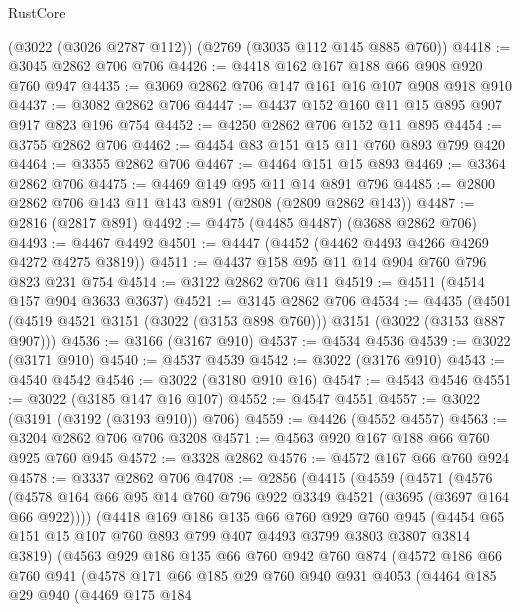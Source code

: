 \begin{lexlean}{RustCore}
\begin{coremodule}
    (@3022 (@3026 @2787 @112))
    (@2769 (@3035 @112 @145 @885 @760))
@4418 := @3045 @2862 @706 @706
@4426 := @4418 @162 @167 @188 @66 @908 @920 @760 @947
@4435 := @3069 @2862 @706 @147 @161 @16 @107 @908 @918 @910
@4437 := @3082 @2862 @706
@4447 := @4437 @152 @160 @11 @15 @895 @907 @917 @823 @196 @754
@4452 := @4250 @2862 @706 @152 @11 @895
@4454 := @3755 @2862 @706
@4462 := @4454 @83 @151 @15 @11 @760 @893 @799 @420
@4464 := @3355 @2862 @706
@4467 := @4464 @151 @15 @893
@4469 := @3364 @2862 @706
@4475 := @4469 @149 @95 @11 @14 @891 @796
@4485 := @2800 @2862 @706 @143 @11 @143 @891 (@2808 (@2809 @2862 @143))
@4487 := @2816 (@2817 @891)
@4492 := @4475 (@4485 @4487) (@3688 @2862 @706)
@4493 := @4467 @4492
@4501 := @4447 (@4452 (@4462 @4493 @4266 @4269 @4272 @4275 @3819))
@4511 := @4437 @158 @95 @11 @14 @904 @760 @796 @823 @231 @754
@4514 := @3122 @2862 @706 @11
@4519 := @4511 (@4514 @157 @904 @3633 @3637)
@4521 := @3145 @2862 @706
@4534 := @4435 (@4501 (@4519 @4521 @3151 (@3022 (@3153 @898 @760))) @3151 (@3022 (@3153 @887 @907)))
@4536 := @3166 (@3167 @910)
@4537 := @4534 @4536
@4539 := @3022 (@3171 @910)
@4540 := @4537 @4539
@4542 := @3022 (@3176 @910)
@4543 := @4540 @4542
@4546 := @3022 (@3180 @910 @16)
@4547 := @4543 @4546
@4551 := @3022 (@3185 @147 @16 @107)
@4552 := @4547 @4551
@4557 := @3022 (@3191 (@3192 (@3193 @910)) @706)
@4559 := @4426 (@4552 @4557)
@4563 := @3204 @2862 @706 @706 @3208
@4571 := @4563 @920 @167 @188 @66 @760 @925 @760 @945
@4572 := @3328 @2862
@4576 := @4572 @167 @66 @760 @924
@4578 := @3337 @2862 @706
@4708 := @2856
    (@4415
      (@4559
        (@4571
          (@4576 (@4578 @164 @66 @95 @14 @760 @796 @922 @3349 @4521 (@3695 (@3697 @164 @66 @922))))
          (@4418
            @169
            @186
            @135
            @66
            @760
            @929
            @760
            @945
            (@4454 @65 @151 @15 @107 @760 @893 @799 @407 @4493 @3799 @3803 @3807 @3814 @3819)
            (@4563
              @929
              @186
              @135
              @66
              @760
              @942
              @760
              @874
              (@4572
                @186
                @66
                @760
                @941
                (@4578
                  @171
                  @66
                  @185
                  @29
                  @760
                  @940
                  @931
                  @4053
                  (@4464
                    @185
                    @29
                    @940
                    (@4469
                      @175
                      @184

\end{coremodule}
\end{lexlean}
